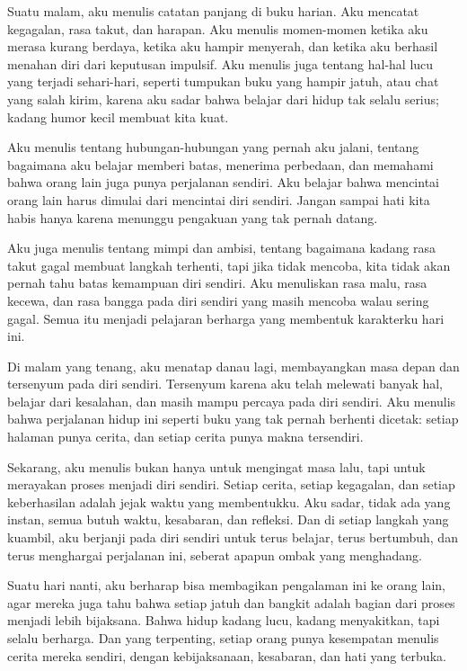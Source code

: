 \documentclass[
  letterpaper,
  DIV=11,
  numbers=noendperiod]{scrreprt}
\begin{document}
Suatu malam, aku menulis catatan panjang di buku harian. Aku mencatat
kegagalan, rasa takut, dan harapan. Aku menulis momen-momen ketika aku
merasa kurang berdaya, ketika aku hampir menyerah, dan ketika aku
berhasil menahan diri dari keputusan impulsif. Aku menulis juga tentang
hal-hal lucu yang terjadi sehari-hari, seperti tumpukan buku yang hampir
jatuh, atau chat yang salah kirim, karena aku sadar bahwa belajar dari
hidup tak selalu serius; kadang humor kecil membuat kita kuat.

Aku menulis tentang hubungan-hubungan yang pernah aku jalani, tentang
bagaimana aku belajar memberi batas, menerima perbedaan, dan memahami
bahwa orang lain juga punya perjalanan sendiri. Aku belajar bahwa
mencintai orang lain harus dimulai dari mencintai diri sendiri. Jangan
sampai hati kita habis hanya karena menunggu pengakuan yang tak pernah
datang.

Aku juga menulis tentang mimpi dan ambisi, tentang bagaimana kadang rasa
takut gagal membuat langkah terhenti, tapi jika tidak mencoba, kita
tidak akan pernah tahu batas kemampuan diri sendiri. Aku menuliskan rasa
malu, rasa kecewa, dan rasa bangga pada diri sendiri yang masih mencoba
walau sering gagal. Semua itu menjadi pelajaran berharga yang membentuk
karakterku hari ini.

Di malam yang tenang, aku menatap danau lagi, membayangkan masa depan
dan tersenyum pada diri sendiri. Tersenyum karena aku telah melewati
banyak hal, belajar dari kesalahan, dan masih mampu percaya pada diri
sendiri. Aku menulis bahwa perjalanan hidup ini seperti buku yang tak
pernah berhenti dicetak: setiap halaman punya cerita, dan setiap cerita
punya makna tersendiri.

Sekarang, aku menulis bukan hanya untuk mengingat masa lalu, tapi untuk
merayakan proses menjadi diri sendiri. Setiap cerita, setiap kegagalan,
dan setiap keberhasilan adalah jejak waktu yang membentukku. Aku sadar,
tidak ada yang instan, semua butuh waktu, kesabaran, dan refleksi. Dan
di setiap langkah yang kuambil, aku berjanji pada diri sendiri untuk
terus belajar, terus bertumbuh, dan terus menghargai perjalanan ini,
seberat apapun ombak yang menghadang.

Suatu hari nanti, aku berharap bisa membagikan pengalaman ini ke orang
lain, agar mereka juga tahu bahwa setiap jatuh dan bangkit adalah bagian
dari proses menjadi lebih bijaksana. Bahwa hidup kadang lucu, kadang
menyakitkan, tapi selalu berharga. Dan yang terpenting, setiap orang
punya kesempatan menulis cerita mereka sendiri, dengan kebijaksanaan,
kesabaran, dan hati yang terbuka.
\end{document}
